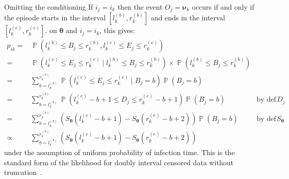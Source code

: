 \documentclass[12pt]{article}
\DeclareMathOperator{\prob}{\mathbb{P}}
\renewcommand{\vec}[1]{\bm{#1}}
\begin{document}
Omitting the conditioning
If $i_j = i_k$ then the event $O_j = \vec{\nu}_k$ occurs if and only if the episode starts in the interval $[l^{(b)}_k, r^{(b)}_k]$ and ends in the interval $[l^{(e)}_k, r^{(e)}_k]$.
 on $\vec{\theta}$ and $i_j = i_k$, this gives:
\begin{align}
p_{ik}
=& \prob \left( l_k^{(b)} \leq B_{j} \leq r_k^{(b)}, l_k^{(e)} \leq E_{j} \leq r_k^{(e)} \right) \\
=& \prob \left( l_k^{(e)} \leq E_{j} \leq r_k^{(e)} \mid l_k^{(b)} \leq B_{j} \leq r_k^{(b)} \right) \times\prob \left( l_k^{(b)} \leq B_{j} \leq r_k^{(b)} \right) \\
=& \sum_{b = l_k^{(b)}}^{r_k^{(b)}} \prob \left( l_k^{(e)} \leq E_{j} \leq r_k^{(e)} \mid B_{j} = b \right) \prob \left(B_{j} = b \right) \\
=& \sum_{b = l_k^{(b)}}^{r_k^{(b)}} \prob \left( l_k^{(e)} - b + 1 \leq D_{j} \leq r_k^{(e)} - b + 1 \right) \prob \left(B_{j} = b \right) &\text{by def of $D_{j}$} \\
=& \sum_{b = l_k^{(b)}}^{r_k^{(b)}} \left( S_{\vec{\theta}}(l_k^{(e)} - b + 1) - S_{\vec{\theta}}(r_k^{(e)} - b + 2) \right) \prob \left(B_{j} = b \right) &\text{by def of $S_{\vec{\theta}}$} \\
\propto& \sum_{b = l_k^{(b)}}^{r_k^{(b)}} \left( S_{\vec{\theta}}(l_k^{(e)} - b + 1) - S_{\vec{\theta}}(r_k^{(e)} - b + 2) \right)
\label{perf-test:eq:pia}
\end{align}
under the assumption of uniform probability of infection time.
This is the standard form of the likelihood for doubly interval censored data without truncation~\citep[e.g.][]{sunEmpirical}.
\end{document}
